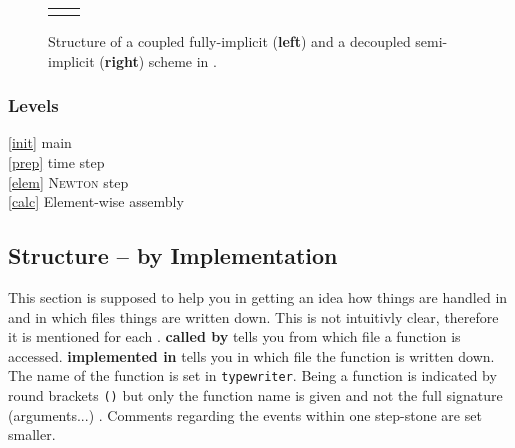 \begin{figure}[hbt]
\begin{tabular}{ l | l }
\begin{minipage}[t]{0.48\textwidth}
\end{minipage}
\end{tabular}

\caption{Structure of a coupled fully-implicit (\textbf{left}) and a decoupled
semi-implicit (\textbf{right}) scheme in \Dumux.}
\label{fig:algorithm}
\end{figure}

\subsubsection{Levels}

\textcircled{\ref{init}} main\\
\textcircled{\ref{prep}} time step\\
\textcircled{\ref{elem}} \textsc{Newton} step\\
\textcircled{\ref{calc}} Element-wise assembly

\subsection{Structure --  by Implementation}
 \label{implementation}
This section is supposed to help you in getting an idea how things are handled in
\Dumux and in which files things are written down.
This is not intuitivly clear, therefore it is mentioned for each .
\textbf{called by} tells you from which file a function is
accessed. \textbf{implemented in} tells you in which file the function is written
down. The name of the function is set in \verb+typewriter+.
Being a function is indicated by round brackets \verb+()+ but only the function
name is given and not the full signature (arguments...) .
 Comments regarding the events within one step-stone are set \scriptsize{smaller}.



